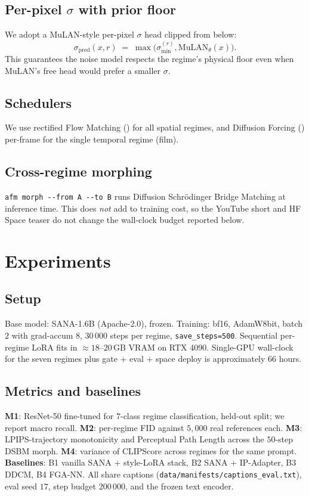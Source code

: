 \documentclass[10pt,a4paper]{article}
\begin{document}
\subsection{Per-pixel $\sigma$ with prior floor}
We adopt a MuLAN-style per-pixel $\sigma$ head clipped from below:
\[
\sigma_{\mathrm{pred}}(x, r) \;=\; \max\!\bigl(\sigma_{\min}^{(r)},
                                              \mathrm{MuLAN}_\theta(x)\bigr).
\]
This guarantees the noise model respects the regime's physical floor
even when MuLAN's free head would prefer a smaller $\sigma$.

\subsection{Schedulers}
We use rectified Flow Matching (\cite{rfm2022}) for all spatial regimes,
and Diffusion Forcing (\cite{diffusionforcing2024}) per-frame for the
single temporal regime (film).

\subsection{Cross-regime morphing}
\verb|afm morph --from A --to B| runs Diffusion Schr\"odinger Bridge
Matching at inference time. This does \emph{not} add to training cost,
so the YouTube short and HF Space teaser do not change the wall-clock
budget reported below.

\section{Experiments}\label{sec:experiments}
\subsection{Setup}
Base model: SANA-1.6B \cite{sana2024} (Apache-2.0), frozen. Training:
bf16, AdamW8bit, batch $2$ with grad-accum $8$, $30\,000$ steps per
regime, \texttt{save\_steps=500}. Sequential per-regime LoRA fits in
$\approx 18$--$20$\,GB VRAM on RTX 4090. Single-GPU wall-clock for the
seven regimes plus gate + eval + space deploy is approximately $66$
hours.

\subsection{Metrics and baselines}
\textbf{M1}: ResNet-50 fine-tuned for $7$-class regime classification,
held-out split; we report macro recall. \textbf{M2}: per-regime FID
against $5{,}000$ real references each. \textbf{M3}: LPIPS-trajectory
monotonicity and Perceptual Path Length across the $50$-step DSBM morph.
\textbf{M4}: variance of CLIPScore across regimes for the same prompt.
\textbf{Baselines}: B1 vanilla SANA + style-LoRA stack, B2 SANA +
IP-Adapter, B3 DDCM, B4 FGA-NN. All share captions
(\texttt{data/manifests/captions\_eval.txt}), eval seed $17$, step
budget $200\,000$, and the frozen text encoder.
\end{document}
